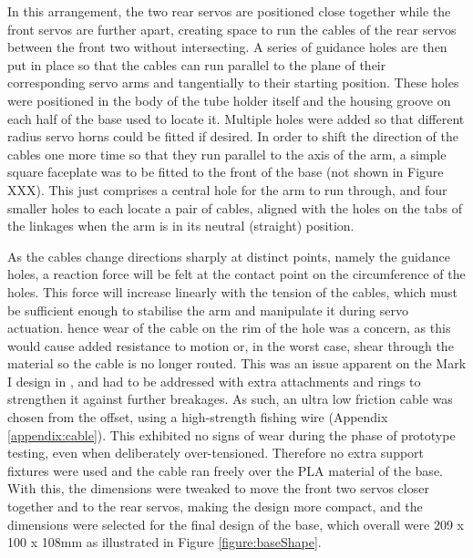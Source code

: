\documentclass[11pt]{article}
\begin{document}
In this arrangement, the two rear servos are positioned close together while the front servos are further apart, creating space to run the cables of the rear servos between the front two without intersecting. A series of guidance holes are then put in place so that the cables can run parallel to the plane of their corresponding servo arms and tangentially to their starting position. These holes were positioned in the body of the tube holder itself and the housing groove on each half of the base used to locate it. Multiple holes were added so that different radius servo horns could be fitted if desired. In order to shift the direction of the cables one more time so that they run parallel to the axis of the arm, a simple square faceplate was to be fitted to the front of the base (not shown in Figure XXX). This just comprises a central hole for the arm to run through, and four smaller holes to each locate a pair of cables, aligned with the holes on the tabs of the linkages when the arm is in its neutral (straight) position.

As the cables change directions sharply at distinct points, namely the guidance holes, a reaction force will be felt at the contact point on the circumference of the holes. This force will increase linearly with the tension of the cables, which must be sufficient enough to stabilise the arm and manipulate it during servo actuation. hence wear of the cable on the rim of the hole was a concern, as this would cause added resistance to motion or, in the worst case, shear through the material so the cable is no longer routed. This was an issue apparent on the Mark I design in \cite{GreggSmithDesign}, and had to be addressed with extra attachments and rings to strengthen it against further breakages. As such, an ultra low friction cable was chosen from the offset, using a high-strength fishing wire (Appendix \ref{appendix:cable}). This exhibited no signs of wear during the phase of prototype testing, even when deliberately over-tensioned. Therefore no extra support fixtures were used and the cable ran freely over the PLA material of the base. With this, the dimensions were tweaked to move the front two servos closer together and to the rear servos, making the design more compact, and the dimensions were selected for the final design of the base, which overall were 209 x 100 x 108mm as illustrated in Figure \ref{figure:baseShape}.
\end{document}
